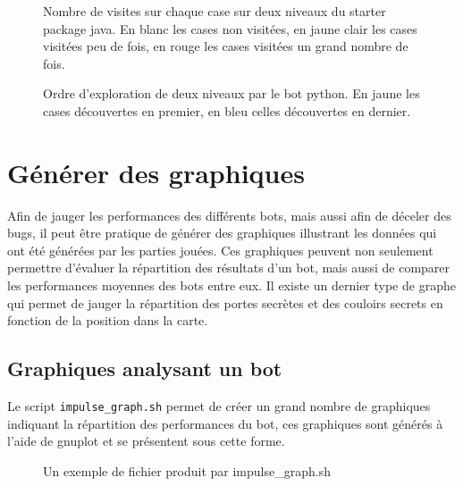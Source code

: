 \documentclass[10pt,a4paper]{report}
\begin{document}
\begin{figure}[h]
	\caption{Nombre de visites sur chaque case sur deux niveaux du starter package java. En blanc les cases non visitées, en jaune clair les cases visitées peu de fois, en rouge les cases visitées un grand nombre de fois.}
	\resizebox{\columnwidth}{!}{}
\end{figure}


\begin{figure}[H]
	\caption{Ordre d'exploration de deux niveaux par le bot python. En
	jaune les cases découvertes en premier, en bleu celles découvertes en
dernier.}
	\resizebox{\columnwidth}{!}{}
\end{figure}


\section{Générer des graphiques}
Afin de jauger les performances des différents bots, mais aussi afin de
déceler des bugs, il peut être pratique de générer des graphiques illustrant les
données qui ont été générées par les parties jouées. Ces graphiques peuvent
non seulement permettre d'évaluer la répartition des résultats d'un bot,
mais aussi de comparer les performances moyennes des bots entre eux. Il existe
un dernier type de graphe qui permet de jauger la répartition des portes
secrètes et des couloirs secrets en fonction de la position dans la carte.



\subsection{Graphiques analysant un bot}
Le script \verb!impulse_graph.sh! permet de créer un grand nombre de
graphiques indiquant la répartition des performances du bot, ces graphiques
sont générés à l'aide de gnuplot et se présentent sous cette forme.

\begin{figure}[H]
	\caption{\label{fig:impulse_graph} Un exemple de fichier produit par impulse\_graph.sh}
\end{figure}
\end{document}
